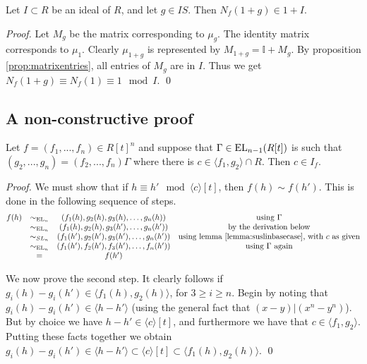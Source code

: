 \begin{lemma}
\label{lemma:cosetnorm}
  Let $I \subset R$ be an ideal of $R$, and let $g \in IS$.
  Then $N_f(1+g) \in 1 + I$.
\end{lemma}
\begin{proof}
  Let $M_g$ be the matrix corresponding to $\mu_g$. The identity matrix corresponds to $\mu_1$.
  Clearly $\mu_{1+g}$ is represented by $M_{1+g} = \mathbb I + M_g$.
  By proposition \ref{prop:matrixentries}, all entries of $M_g$ are in $I$.
  Thus we get $N_f(1+g) \equiv N_f(1) \equiv 1 \mod I$.
  \qed
\end{proof}

\subsection{A non-constructive proof}
\label{sec:suslin_nonconstructive}

\begin{lemma}
\label{lemma:cinif}
  Let $f = (f_1, ..., f_n) \in R[t]^n$ and suppose that $\Gamma \in \text{EL}_{n-1}(R[t])$
  is such that $(g_2, ..., g_n) = (f_2, ..., f_n) \Gamma$ where there is $c \in \langle f_1, g_2 \rangle \cap R$.
  Then $c \in I_f$.
\end{lemma}
\begin{proof}
  We must show that if $h \equiv h' \mod \langle c \rangle [t]$, then $f(h) \sim f(h')$.
  This is done in the following sequence of steps.
  \[
    \begin{matrix}
      f(h) & \sim_{\text{EL}_n} & (f_1(h) , g_2(h), g_3(h), \dots, g_n(h))    & \text{using $\Gamma$}              \\
           & \sim_{\text{EL}_n} & (f_1(h) , g_2(h), g_3(h'), \dots, g_n(h'))  & \text{by the derivation below}       \\
           & \sim_{SL_n}& (f_1(h'), g_2(h'), g_3(h'), \dots, g_n(h')) & \text{using lemma \ref{lemma:suslinbasecase}, with $c$ as given}       \\
           & \sim_{\text{EL}_n} & (f_1(h'), f_2(h'), f_3(h'), \dots, f_n(h')) & \text{using $\Gamma$ again}       \\
           & =          & f(h')                                     &  \\
    \end{matrix}
  \]

  We now prove the second step.
  It clearly follows if $g_i(h) - g_i(h') \in \langle f_1(h), g_2(h) \rangle$, for $3 \geq i \geq n$.
  Begin by noting that $g_i(h) - g_i(h') \in \langle h - h'\rangle$ (using the general fact that $(x - y) | (x^n - y^n)$).
  But by choice we have $h - h' \in \langle c \rangle[t]$, and furthermore we have that $c \in \langle f_1, g_2 \rangle$.
  Putting these facts together we obtain $g_i(h) - g_i(h') \in \langle h - h' \rangle \subset \langle c \rangle [t] \subset \langle f_1(h), g_2(h) \rangle$.
  \qed
\end{proof}

